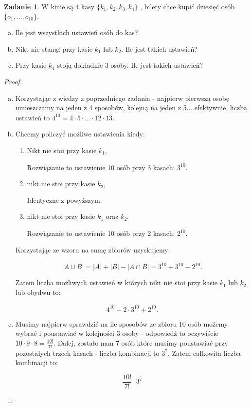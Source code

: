 \documentclass[11pt]{article}
\theoremstyle{definition}
\newtheorem{zadanie}{Zadanie}
\numberwithin{zadanie}{subsection}
\begin{document}
\begin{zadanie}
    W kinie są 4 kasy $\{ k_1, k_2, k_3, k_4 \}$ , bilety chce kupić dziesięć osób $\{ o_1, \dots, o_{10}\}$.

    \begin{enumerate}[a)]
        \item Ile jest wszystkich ustawień osób do kas?
        \item Nikt nie stanął przy kasie $k_1$ lub $k_2$. Ile jest takich ustawień?
        \item Przy kasie $k_4$ stoją dokładnie 3 osoby. Ile jest takich ustawień?
    \end{enumerate}
\end{zadanie}
\begin{proof}
    \begin{enumerate}[a)]
        \item Korzystając z wiedzy z poprzedniego zadania - najpierw pierwszą osobę umieszczamy na jeden z 4 sposobów, kolejną na jeden z 5... efektywnie, liczba ustawień to $4^{\overline{10}} = 4\cdot5\cdot...\cdot12\cdot13$.
        \item Chcemy policzyć możliwe ustawienia kiedy:
              \begin{enumerate}
                  \item Nikt nie stoi przy kasie $k_1$,

                        Rozwiązanie to ustawienie 10 osób przy 3 kasach: $3^{\overline{10}}$.
                  \item nikt nie stoi przy kasie $k_2$,

                        Identyczne z powyższym.
                  \item nikt nie stoi przy kasie $k_1$ oraz $k_2$.

                        Rozwiązanie to ustawienie 10 osób przy 2 kasach: $2^{\overline{10}}$.
              \end{enumerate}

              Korzystając ze wzoru na sumę zbiorów uzyskujemy:

              $$|A\cup B| = |A|+|B|-|A\cap B| = 3^{\overline{10}}+3^{\overline{10}}-2^{\overline{10}}.$$

              Zatem liczba możliwych ustawień w których nikt nie stoi przy kasie $k_1$ lub $k_2$ lub obydwu to:

              $$4^{\overline{10}} - 2\cdot3^{\overline{10}} + 2^{\overline{10}}.$$

        \item Musimy najpierw sprawdzić na ile sposobów ze zbioru 10 osób możemy wybrać i poustawiać w kolejności 3 osoby - odpowiedź to oczywiście $10\cdot9\cdot8 = \frac{10!}{7!}$. Dalej, zostało nam 7 osób które musimy poustawiać przy pozostałych trzech kasach - liczba kombinacji to $3^{\overline{7}}$. Zatem całkowita liczba kombinacji to:

              $$\frac{10!}{7!}\cdot 3^{\overline{7}}$$
    \end{enumerate}
\end{proof}
\end{document}
